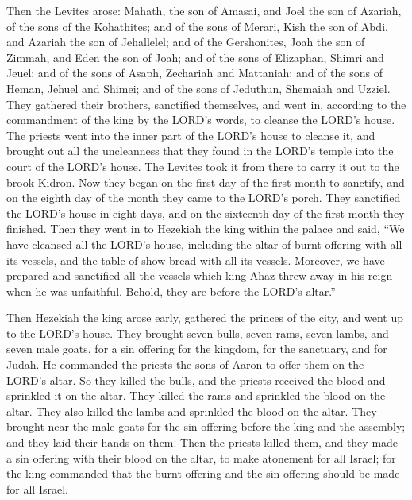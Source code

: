  Then the Levites arose: Mahath, the son of Amasai, and
Joel the son of Azariah, of the sons of the Kohathites; and of the sons
of Merari, Kish the son of Abdi, and Azariah the son of Jehallelel; and
of the Gershonites, Joah the son of Zimmah, and Eden the son of Joah;
 and of the sons of Elizaphan, Shimri and Jeuel; and of
the sons of Asaph, Zechariah and Mattaniah;  and of the
sons of Heman, Jehuel and Shimei; and of the sons of Jeduthun, Shemaiah
and Uzziel.  They gathered their brothers, sanctified
themselves, and went in, according to the commandment of the king by the
LORD's words, to cleanse the LORD's house.  The priests
went into the inner part of the LORD's house to cleanse it, and brought
out all the uncleanness that they found in the LORD's temple into the
court of the LORD's house. The Levites took it from there to carry it
out to the brook Kidron.  Now they began on the first day
of the first month to sanctify, and on the eighth day of the month they
came to the LORD's porch. They sanctified the LORD's house in eight
days, and on the sixteenth day of the first month they finished.
 Then they went in to Hezekiah the king within the palace
and said, ``We have cleansed all the LORD's house, including the altar
of burnt offering with all its vessels, and the table of show bread with
all its vessels.  Moreover, we have prepared and
sanctified all the vessels which king Ahaz threw away in his reign when
he was unfaithful. Behold, they are before the LORD's altar.''

 Then Hezekiah the king arose early, gathered the princes
of the city, and went up to the LORD's house.  They
brought seven bulls, seven rams, seven lambs, and seven male goats, for
a sin offering for the kingdom, for the sanctuary, and for Judah. He
commanded the priests the sons of Aaron to offer them on the LORD's
altar.  So they killed the bulls, and the priests
received the blood and sprinkled it on the altar. They killed the rams
and sprinkled the blood on the altar. They also killed the lambs and
sprinkled the blood on the altar.  They brought near the
male goats for the sin offering before the king and the assembly; and
they laid their hands on them.  Then the priests killed
them, and they made a sin offering with their blood on the altar, to
make atonement for all Israel; for the king commanded that the burnt
offering and the sin offering should be made for all Israel.


